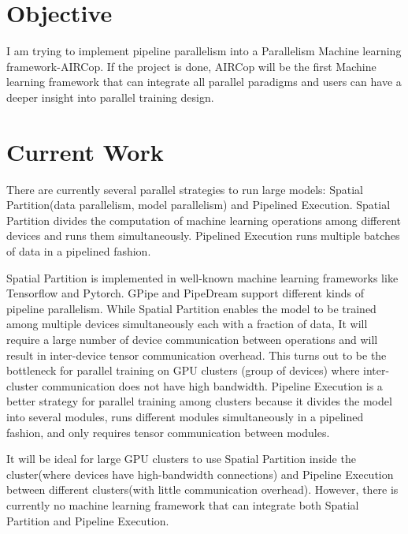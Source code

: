 \documentclass[sigplan,nonacm]{acmart}
\begin{document}





\maketitle

\section{Objective}
I am trying to implement pipeline parallelism into a Parallelism Machine learning framework-AIRCop. If the project is done, AIRCop will be the first Machine learning framework that can integrate all parallel paradigms and users can have a deeper insight into parallel training design.

\section{Current Work}
There are currently several parallel strategies to run large models: Spatial Partition(data parallelism, model parallelism) and Pipelined Execution. Spatial Partition divides the computation of machine learning operations among different devices and runs them simultaneously. Pipelined Execution runs multiple batches of data in a pipelined fashion.\par
 Spatial Partition is implemented in well-known machine learning frameworks like Tensorflow and Pytorch. GPipe and PipeDream support different kinds of pipeline parallelism. While Spatial Partition enables the model to be trained among multiple devices simultaneously each with a fraction of data, It will require a large number of device communication between operations and will result in inter-device tensor communication overhead. This turns out to be the bottleneck for parallel training on GPU clusters (group of devices) where inter-cluster communication does not have high bandwidth. Pipeline Execution is a better strategy for parallel training among clusters because it divides the model into several modules, runs different modules simultaneously in a pipelined fashion, and only requires tensor communication between modules. \par 
 It will be ideal for large GPU clusters to use Spatial Partition inside the cluster(where devices have high-bandwidth connections) and Pipeline Execution between different clusters(with little communication overhead). However, there is currently no machine learning framework that can integrate both Spatial Partition and Pipeline Execution. 
\end{document}
